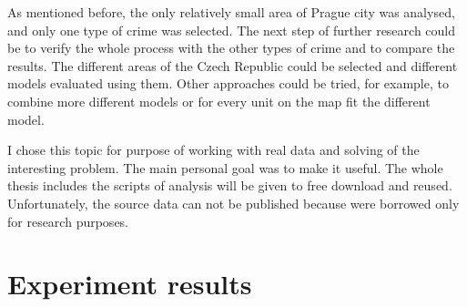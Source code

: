 \documentclass[thesis=M,english]{FITthesis}[2012/10/20]
\begin{document}
\begin{conclusion}
    As mentioned before, the only relatively small area of Prague city was analysed, and only one type of crime was selected. The next step of further research could be to verify the whole process with the other types of crime and to compare the results. The different areas of the Czech Republic could be selected and different models evaluated using them. Other approaches could be tried, for example, to combine more different models or for every unit on the map fit the different model.
    
    I chose this topic for purpose of working with real data and solving of the interesting problem. The main personal goal was to make it useful. The whole thesis includes the scripts of analysis will be given to free download and reused. Unfortunately, the source data can not be published because were borrowed only for research purposes.
	
\end{conclusion}




\appendix

\chapter{Experiment results}\label{appendix:result}
\end{document}
